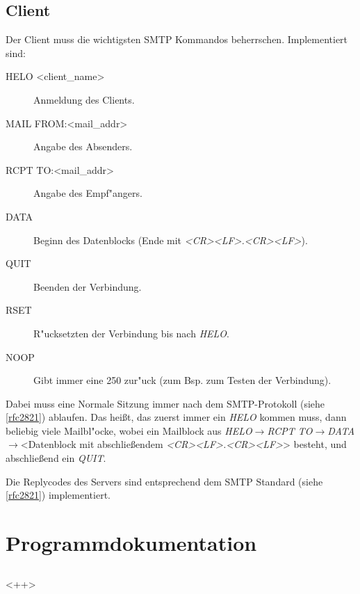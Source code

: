 \documentclass[pdftex,final,a4paper,10pt,notitlepage,halfparskip]{scrreprt}
\begin{document}
\section{Client}
Der Client muss die wichtigsten SMTP Kommandos beherrschen. Implementiert sind:
\begin{description}
  \item[HELO <client\_name>] Anmeldung des Clients.
  \item[MAIL FROM:<mail\_addr>] Angabe des Absenders.
  \item[RCPT TO:<mail\_addr>] Angabe des Empf"{a}ngers.
  \item[DATA] Beginn des Datenblocks (Ende mit \textit{<CR><LF>.<CR><LF>}).
  \item[QUIT] Beenden der Verbindung.
  \item[RSET] R"{u}cksetzten der Verbindung bis nach \textit{HELO}. 
  \item[NOOP] Gibt immer eine 250 zur"{u}ck (zum Bsp. zum Testen der Verbindung).
\end{description}

Dabei muss eine Normale Sitzung immer nach dem SMTP-Protokoll (siehe \ref{rfc2821}) ablaufen. Das heißt, das zuerst immer ein \textit{HELO} kommen muss, dann beliebig viele Mailbl"{o}cke, wobei ein Mailblock aus \textit{HELO}$\rightarrow$\textit{RCPT TO}$\rightarrow$\textit{DATA}$\rightarrow$<Datenblock mit abschließendem \textit{<CR><LF>.<CR><LF>}> besteht, und abschließend ein \textit{QUIT}.

Die Replycodes des Servers sind entsprechend dem SMTP Standard (siehe \ref{rfc2821}) implementiert.

\chapter{Programmdokumentation}
\section{}<++>
\end{document}
